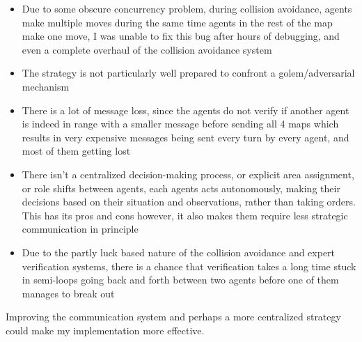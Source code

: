 \documentclass[a4paper, 12pt]{article}
\begin{document}
\begin{itemize}
    \item Due to some obscure concurrency problem, during collision avoidance, agents make multiple moves during the same time agents in the rest of the map make one move, I was unable to fix this bug after hours of debugging, and even a complete overhaul of the collision avoidance system
    \item The strategy is not particularly well prepared to confront a golem/adversarial mechanism
    \item There is a lot of message loss, since the agents do not verify if another agent is indeed in range with a smaller message before sending all 4 maps which results in very expensive messages being sent every turn by every agent, and most of them getting lost
    \item There isn't a centralized decision-making process, or explicit area assignment, or role shifts between agents, each agents acts autonomously, making their decisions based on their situation and observations, rather than taking orders. This has its pros and cons however, it also makes them require less strategic communication in principle
    \item Due to the partly luck based nature of the collision avoidance and expert verification systems, there is a chance that verification takes a long time stuck in semi-loops going back and forth between two agents before one of them manages to break out
\end{itemize}

Improving the communication system and perhaps a more centralized strategy could make my implementation more effective.
\end{document}
